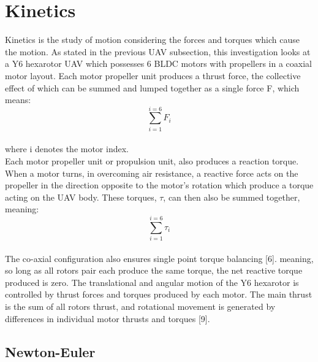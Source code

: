 \documentclass[12pt,a4paper,twoside]{report}
\begin{document}
		\section{Kinetics}
			
			Kinetics is the study of motion considering the forces and torques which cause the motion. As stated in the previous UAV subsection, this investigation looks at a Y6 hexarotor UAV which possesses 6 BLDC motors with propellers in a coaxial motor layout. Each motor propeller unit produces a thrust force, the collective effect of which can be summed and lumped together as a single force F, which means:
			\\
			\[\sum_{i = 1}^{i = 6}F_i\]
			\\
			where i denotes the motor index.
			\\
			Each motor propeller unit or propulsion unit, also produces a reaction torque. When a motor turns, in overcoming air resistance, a reactive force acts on the propeller in the direction opposite to the motor's rotation which produce a torque acting on the UAV body. These torques, $\tau$, can then also be summed together, meaning:
			\\
			\[\sum_{i = 1}^{i = 6}\tau_i\] 
			\\
			The co-axial configuration also ensures single point torque balancing [6]. meaning, so long as all rotors pair each produce the same torque, the net reactive torque produced is zero. The translational and angular motion of the Y6 hexarotor is controlled by thrust forces and torques produced by each motor. The main thrust is the sum of all rotors thrust, and rotational movement is generated by differences in individual motor thrusts and torques [9].
				
			\subsection{Newton-Euler}
				
\end{document}
